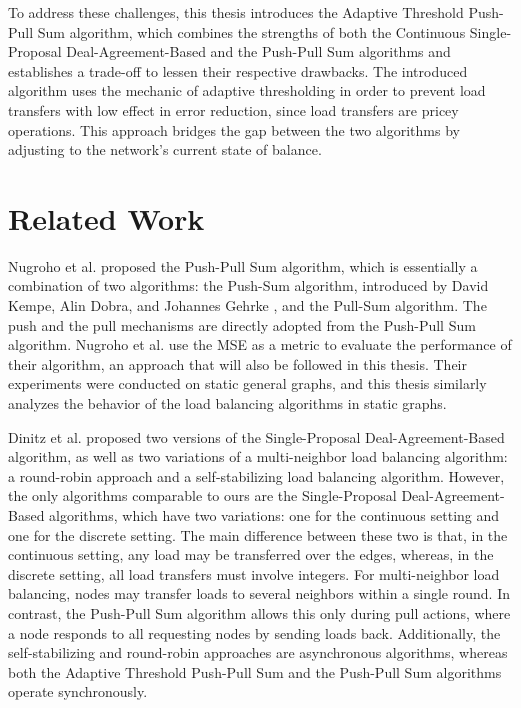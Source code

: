 To address these challenges, this thesis introduces the Adaptive Threshold Push-Pull Sum algorithm, which combines the strengths of both the Continuous Single-Proposal Deal-Agreement-Based and the Push-Pull Sum algorithms and establishes a trade-off to lessen their respective drawbacks. The introduced algorithm uses the mechanic of adaptive thresholding in order to prevent load transfers with low effect in error reduction, since load transfers are pricey operations. This approach bridges the gap between the two algorithms by adjusting to the network's current state of balance.

\section{Related Work}\label{sec:relatedwork}
Nugroho et al. \cite{nugroho2023PushPullSumDataAg} proposed the Push-Pull Sum algorithm, which is essentially a combination of two algorithms: the Push-Sum algorithm, introduced by David Kempe, Alin Dobra, and Johannes Gehrke \cite{kempe2003gossipbasedComp}, and the Pull-Sum algorithm. The push and the pull mechanisms are directly adopted from the Push-Pull Sum algorithm. Nugroho et al. use the MSE as a metric to evaluate the performance of their algorithm, an approach that will also be followed in this thesis. Their experiments were conducted on static general graphs, and this thesis similarly analyzes the behavior of the load balancing algorithms in static graphs.

Dinitz et al. \cite{Dinitz2023DAB} proposed two versions of the Single-Proposal Deal-Agreement-Based algorithm, as well as two variations of a multi-neighbor load balancing algorithm: a round-robin approach and a self-stabilizing load balancing algorithm. However, the only algorithms comparable to ours are the Single-Proposal Deal-Agreement-Based algorithms, which have two variations: one for the continuous setting and one for the discrete setting. The main difference between these two is that, in the continuous setting, any load may be transferred over the edges, whereas, in the discrete setting, all load transfers must involve integers. For multi-neighbor load balancing, nodes may transfer loads to several neighbors within a single round. In contrast, the Push-Pull Sum algorithm allows this only during pull actions, where a node responds to all requesting nodes by sending loads back. Additionally, the self-stabilizing and round-robin approaches are asynchronous algorithms, whereas both the Adaptive Threshold Push-Pull Sum and the Push-Pull Sum algorithms operate synchronously.

